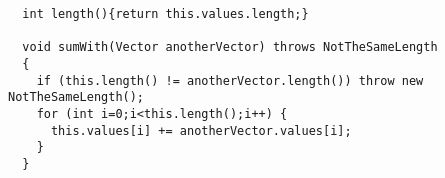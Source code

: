 \documentclass[correction]{exercices}
\begin{document}
\begin{correction}
\begin{verbatim}
  int length(){return this.values.length;}

  void sumWith(Vector anotherVector) throws NotTheSameLength 
  {
    if (this.length() != anotherVector.length()) throw new NotTheSameLength();
    for (int i=0;i<this.length();i++) {
      this.values[i] += anotherVector.values[i];
    }
  }
\end{verbatim}
\end{correction}
\end{document}
